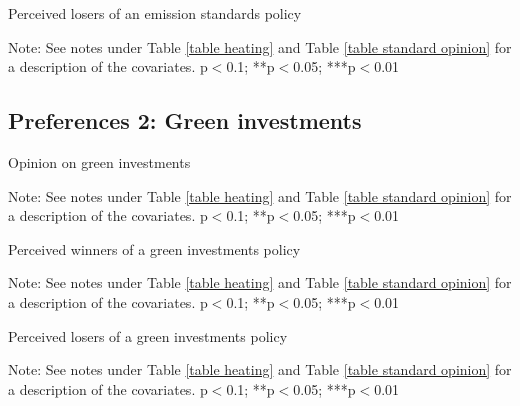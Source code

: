 \documentclass{article}
\begin{document}
\begin{table}[h!]
	\caption{Perceived losers of an emission standards policy}
	\begin{center}
		\scalebox{0.7}{}
	\end{center}
	{\footnotesize Note: See notes under Table \ref{table heating} and Table \ref{table standard opinion} for a description of the covariates.
	\newline *p$<$0.1; **p$<$0.05; ***p$<$0.01}
\end{table}	

\clearpage
\subsection{Preferences 2: Green investments}

\begin{table}[h!]
	\caption{Opinion on green investments}
	\begin{center}
		\scalebox{0.7}{}
	\end{center}
	{\footnotesize Note: See notes under Table \ref{table heating} and Table \ref{table standard opinion} for a description of the covariates.
	\newline *p$<$0.1; **p$<$0.05; ***p$<$0.01}
\end{table}	

\begin{table}[h!]
	\caption{Perceived winners of a green investments policy}
	\begin{center}
		\scalebox{0.7}{}
	\end{center}
	{\footnotesize Note: See notes under Table \ref{table heating} and Table \ref{table standard opinion} for a description of the covariates.
	\newline *p$<$0.1; **p$<$0.05; ***p$<$0.01}
\end{table}	

\begin{table}[h!]
	\caption{Perceived losers of a green investments policy}
	\begin{center}
		\scalebox{0.7}{}
	\end{center}
	{\footnotesize Note: See notes under Table \ref{table heating} and Table \ref{table standard opinion} for a description of the covariates.
	\newline *p$<$0.1; **p$<$0.05; ***p$<$0.01}
\end{table}	
\end{document}
